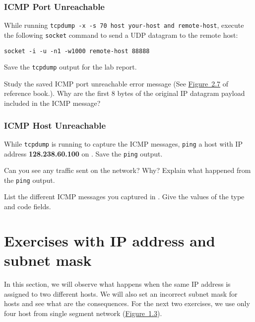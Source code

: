 \documentclass{../UTNetLab}
\begin{document}
\section{ICMP Port Unreachable}
    While running \lstinline[emph={your-host, remote-host}]{tcpdump -x -s 70 host your-host and remote-host}, execute the following \lstinline{socket} command to send a UDP datagram to the remote host:

    \begin{lstlisting}[emph={your-host, remote-host}]
socket -i -u -n1 -w1000 remote-host 88888
    \end{lstlisting}

    Save the \lstinline{tcpdump} output for the lab report.

    \begin{report}
        \item Study the saved ICMP port unreachable error message (See \hyperref[fig:2.7]{Figure~2.7} of reference book.).
            Why are the first 8 bytes of the original IP datagram payload included in the ICMP message?
    \end{report}

\section{ICMP Host Unreachable}
    While \lstinline{tcpdump} is running to capture the ICMP messages, \lstinline{ping} a host with IP address \textbf{128.238.60.100} on .
    Save the \lstinline{ping} output.
    
    \begin{report}
        \item Can you see any traffic sent on the network? Why? Explain what happened from the \lstinline{ping} output.

        \item List the different ICMP messages you captured in .
            Give the values of the type and code fields.
    \end{report}

\part{Exercises with IP address and subnet mask}
    In this section, we will observe what happens when the same IP address is assigned to two different hosts.
    We will also set an incorrect subnet mask for hosts and see what are the consequences.
    For the next two exercises, we use only four host from single segment network (\hyperref[fig:1.3]{Figure~1.3}).
\end{document}
